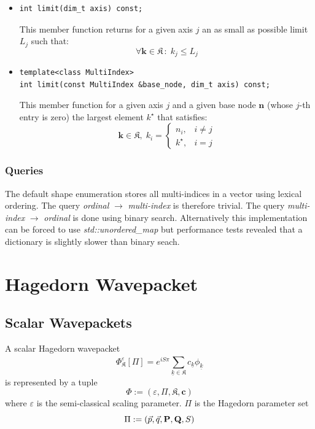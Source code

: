 \documentclass{article}
\begin{document}
\begin{itemize}
\item
\begin{verbatim}
int limit(dim_t axis) const;
\end{verbatim}
  This member function returns for a given axis \( j \)
  an as small as possible limit \( L_j \) such that:
  \[ \forall \boldsymbol{k} \in \mathfrak{K} \,\colon\; k_j \leq
    L_j \]

\item
\begin{verbatim}
template<class MultiIndex>
int limit(const MultiIndex &base_node, dim_t axis) const;
\end{verbatim}
  This member function for a given axis \( j \)
  and a given base node \( \boldsymbol{n} \)
  (whose \( j \)-th
  entry is zero) the largest element \( k^\star \) that satisfies:
  \[ \boldsymbol{k} \in \mathfrak{K}, \; k_i =
    \begin{cases}
      n_i,& i \neq j\\
      k^\star, & i = j
    \end{cases}
  \]

\end{itemize}

\subsubsection{Queries}
The default shape enumeration stores all multi-indices in a vector
using lexical ordering. The query \emph{ordinal} \(\rightarrow\)
\emph{multi-index} is therefore trivial. The query \emph{multi-index}
\(\rightarrow\)
\emph{ordinal} is done using binary search. Alternatively this
implementation can be forced to use \emph{std::unordered\_map} but
performance tests revealed that a dictionary is slightly slower than
binary seach.

\section{Hagedorn Wavepacket}
\subsection{Scalar Wavepackets}
A scalar Hagedorn wavepacket
\[
  \Phi_{\mathfrak{K}}^{\varepsilon}[\Pi] = e^{iS\pi} \sum_{\underline{k} \in
    \mathfrak{K}}^{} c_{\underline{k}} \phi_{\underline{k}} \]
is represented by a tuple
\[ \Phi := \left( \varepsilon, \Pi, \mathfrak{K}, \boldsymbol{c}
  \right) \]
where \(\varepsilon\) is the semi-classical scaling parameter.
\(\Pi\) is the Hagedorn parameter set
\[ \Pi := \left( \vec{p}, \vec{q}, \mathbf{P}, \mathbf{Q}, S \right) \]
\end{document}

